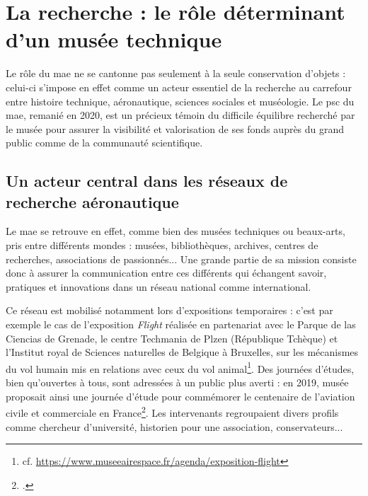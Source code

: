 \section{\label{I-A-2}La recherche : le rôle déterminant d'un musée technique}


%
%
%


Le rôle du \ac{mae} ne se cantonne pas seulement à la seule conservation d’objets : celui-ci s'impose en effet comme un acteur essentiel de la recherche au carrefour entre histoire technique, aéronautique, sciences sociales et muséologie.  Le \ac{psc} du \acf{mae}, remanié en 2020, est un précieux témoin du difficile équilibre recherché par le musée pour assurer la visibilité et valorisation de ses fonds auprès du grand public comme de la communauté scientifique.

\subsection{Un acteur central dans les réseaux de recherche aéronautique}

Le \ac{mae} se retrouve en effet, comme bien des musées techniques ou beaux-arts, pris entre différents mondes : musées, bibliothèques, archives, centres de recherches, associations de passionnés... Une grande partie de sa mission consiste donc à assurer la communication entre ces différents qui échangent savoir, pratiques et innovations dans un réseau national comme international.

Ce réseau est mobilisé notamment lors d'expositions temporaires : c'est par exemple le cas de l'exposition \emph{Flight} réalisée en partenariat avec le Parque de las Ciencias de Grenade, le centre Techmania de Plzen (République Tchèque) et l’Institut royal de Sciences naturelles
de Belgique à Bruxelles, sur les mécanismes du vol humain mis en relations avec ceux du vol animal\footnote{cf. \href{https://www.museeairespace.fr/agenda/exposition-flight}{https://www.museeairespace.fr/agenda/exposition-flight}}. Des journées d'études, bien qu'ouvertes à tous, sont adressées à un public plus averti : en 2019, musée proposait ainsi une journée d'étude pour commémorer le centenaire de l'aviation civile et commerciale en France\footcite{19192019CentAns}. Les intervenants regroupaient divers profils comme chercheur d'université, historien pour une association, conservateurs...

